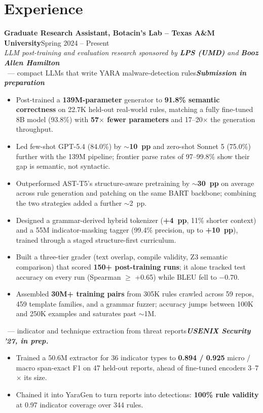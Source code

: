 \documentclass[letterpaper,10pt]{article}
\newcommand{\heading}[2]{\textbf{#1}\hfill #2\\}
\newcommand{\note}[1]{{\color{muted}\textit{#1}}\\[-1pt]}
\newcommand{\proj}[3]{\vspace{3pt}{\color{accent}\textbf{#1}}\ {\color{muted}--- #2}\hfill\textit{\textbf{#3}}\\[-1pt]}
\begin{document}
\section{Experience}
\heading{Graduate Research Assistant, Botacin's Lab -- Texas A\&M University}{Spring 2024 -- Present}
\note{LLM post-training and evaluation research sponsored by \textbf{LPS (UMD)} and \textbf{Booz Allen Hamilton}}
\proj{YaraGen}{compact LLMs that write YARA malware-detection rules}{Submission in preparation}
\begin{itemize}
  \item Post-trained a \textbf{139M-parameter} generator to \textbf{91.8\% semantic correctness} on 22.7K held-out real-world rules, matching a fully fine-tuned 8B model (93.8\%) with \textbf{57$\times$ fewer parameters} and 17--20$\times$ the generation throughput.
  \item Led few-shot GPT-5.4 (84.0\%) by $\sim$\textbf{10~pp} and zero-shot Sonnet 5 (75.0\%) further with the 139M pipeline; frontier parse rates of 97--99.8\% show their gap is semantic, not syntactic.
  \item Outperformed AST-T5's structure-aware pretraining by $\sim$\textbf{30~pp} on average across rule generation and patching on the same BART backbone; combining the two strategies added a further $\sim$2~pp.
  \item Designed a grammar-derived hybrid tokenizer (\textbf{+4~pp}, 11\% shorter context) and a 55M indicator-masking tagger (99.4\% precision, up to \textbf{+10~pp}), trained through a staged structure-first curriculum.
  \item Built a three-tier grader (text overlap, compile validity, Z3 semantic comparison) that scored \textbf{150+ post-training runs}; it alone tracked test accuracy on every run (Spearman $\geq$ +0.65) while BLEU fell to $-$0.70.
  \item Assembled \textbf{30M+ training pairs} from 305K rules crawled across 59 repos, 459 template families, and a grammar fuzzer; accuracy jumps between 100K and 250K examples and saturates past $\sim$1M.
\end{itemize}
\proj{IOCScooper++}{indicator and technique extraction from threat reports}{USENIX Security '27, in prep.}
\begin{itemize}
  \item Trained a 50.6M extractor for 36 indicator types to \textbf{0.894 / 0.925} micro / macro span-exact F1 on 47 held-out reports, ahead of fine-tuned encoders 3--7$\times$ its size.
  \item Chained it into YaraGen to turn reports into detections: \textbf{100\% rule validity} at 0.97 indicator coverage over 344 rules.
\end{itemize}
\end{document}
